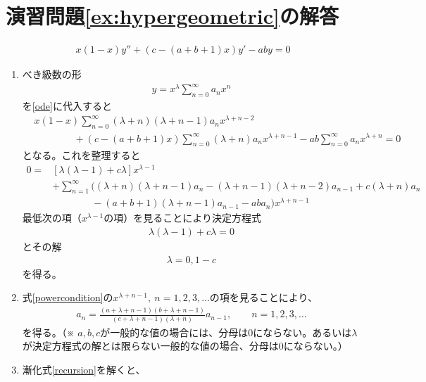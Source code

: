 \documentclass[report,paper=a4, fontsize=12pt, line_length=16cm, number_of_lines=33,dvipdfmx]{jlreq}
\numberwithin{equation}{section}
\begin{document}
\section*{演習問題\ref{ex:hypergeometric}の解答}
\begin{align}
  x(1-x)y'' + \left(c-(a+b+1)x\right)y' - aby=0\tag{＊}
  \label{ode}
\end{align}


\begin{enumerate}
\setlength{\itemsep}{10mm}
\item べき級数の形
\begin{align}
  y=x^{\lambda}\sum_{n=0}^{\infty}a_{n}x^{n}\tag{♯}
  \label{powerseriessol}
\end{align}
を\eqref{ode}に代入すると
\begin{align*}
  &x(1-x)\sum_{n=0}^{\infty}(\lambda+n)(\lambda+n-1)a_{n}x^{\lambda+n-2}\\
  &\qquad\qquad+(c-(a+b+1)x)\sum_{n=0}^{\infty}(\lambda+n)a_{n}x^{\lambda+n-1}
  -ab\sum_{n=0}^{\infty}a_{n}x^{\lambda+n}=0
\end{align*}
となる。これを整理すると
\begin{align}
  0=&[\lambda(\lambda-1)+c\lambda]x^{\lambda-1}
  \nonumber\\
  &+\sum_{n=1}^{\infty}
  \Big(
      (\lambda+n)(\lambda+n-1)a_n
      -(\lambda+n-1)(\lambda+n-2)a_{n-1}
      +c(\lambda+n)a_{n}\nonumber\\
      &\qquad\qquad -(a+b+1)(\lambda+n-1)a_{n-1}
      -ab a_{n}
  \Big)x^{\lambda+n-1}\tag{☆}\label{powercondition}
\end{align}
最低次の項（$x^{\lambda-1}$の項）を見ることにより決定方程式
\begin{align*}
  \lambda(\lambda-1)+c\lambda=0
\end{align*}
とその解
\begin{align*}
  \lambda=0,1-c
\end{align*}
を得る。
\item 式\eqref{powercondition}の$x^{\lambda+n-1},\ n=1,2,3,\dots$の項を見ることにより、
\begin{align}
  a_{n}=\frac{(a+\lambda+n-1)(b+\lambda+n-1)}{(c+\lambda+n-1)(\lambda+n)}a_{n-1},\qquad n=1,2,3,\dots
  \tag{♡}
  \label{recursion}
\end{align}
を得る。（※ $a,b,c$が一般的な値の場合には、分母は$0$にならない。あるいは$\lambda$が決定方程式の解とは限らない一般的な値の場合、分母は$0$にならない。）
\item 漸化式\eqref{recursion}を解くと、
\begin{align}

\end{align}
\end{enumerate}
\end{document}
